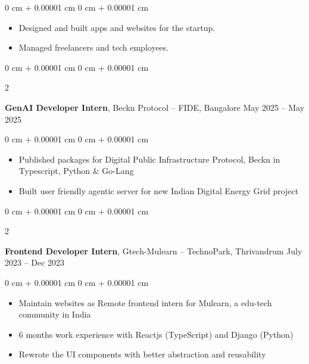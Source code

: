 \documentclass[10pt, letterpaper]{article}
\newenvironment{highlights}{
    \begin{itemize}[
        topsep=0.10 cm,
        parsep=0.10 cm,
        partopsep=0pt,
        itemsep=0pt,
        leftmargin=0 cm + 10pt
    ]
}{
    \end{itemize}
} %
\newenvironment{onecolentry}{
    \begin{adjustwidth}{
        0 cm + 0.00001 cm
    }{
        0 cm + 0.00001 cm
    }
}{
    \end{adjustwidth}
} %
\newenvironment{twocolentry}[2][]{
    \onecolentry
    \def\secondColumn{#2}
    \setcolumnwidth{\fill, 4.5 cm}
    \begin{paracol}{2}
}{
    \switchcolumn \raggedleft \secondColumn
    \end{paracol}
    \endonecolentry
} %
\begin{document}
\vspace{0.10 cm}
\begin{onecolentry}
	\begin{highlights}
		\item Designed and built apps and websites for the startup.
		\item Managed freelancers and tech employees.
	\end{highlights}
\end{onecolentry}

\vspace{0.2 cm}

\begin{twocolentry}{
		May 2025 – May 2025
	}
	\textbf{GenAI Developer Intern}, Beckn Protocol -- FIDE, Bangalore\end{twocolentry}

\vspace{0.10 cm}
\begin{onecolentry}
	\begin{highlights}
		\item Published packages for Digital Public Infrastructure Protocol, Beckn in Typescript, Python \& Go-Lang
		\item Built user friendly agentic server for new Indian Digital Energy Grid project
	\end{highlights}
\end{onecolentry}

\vspace{0.2 cm}

\begin{twocolentry}{
		July 2023 – Dec 2023
	}
	\textbf{Frontend Developer Intern}, Gtech-Mulearn -- TechnoPark, Thrivandrum\end{twocolentry}

\vspace{0.10 cm}
\begin{onecolentry}
	\begin{highlights}
		\item Maintain websites as Remote frontend intern for Mulearn, a edu-tech community
		in India
		\item 6 months work experience with Reactjs (TypeScript) and Django (Python)
		\item Rewrote the UI components with better abstraction and reusability
	\end{highlights}
\end{onecolentry}

\vspace{0.2 cm}
\end{document}
